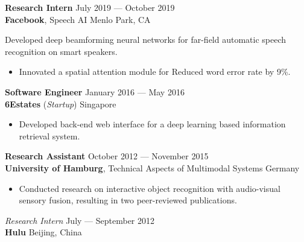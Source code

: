 \documentclass[a4paper,9pt]{extarticle} %
\begin{document}

\textbf{Research Intern} \hfill July 2019 --- October 2019 \\
\textbf{Facebook}, Speech AI  \hfill Menlo Park, CA \\
\vspace{-1.5\parskip}

Developed deep beamforming neural networks for far-field automatic speech recognition on smart speakers.
\vspace{-1.8\parskip}
\begin{itemize}[nosep]
  \item Innovated a spatial attention module for Reduced word error rate by 9\%.
\end{itemize}


\textbf{Software Engineer} \hfill January 2016 --- May 2016 \\
\textbf{6Estates} (\textit{Startup})  \hfill Singapore \\
\vspace{-1.5\parskip}

\begin{itemize}[nosep]
  \item Developed back-end web interface for a deep learning based information retrieval system.
\end{itemize}


\textbf{Research Assistant} \hfill October 2012 --- November 2015 \\
\textbf{University of Hamburg}, Technical Aspects of Multimodal Systems \hfill Germany \\
\vspace{-1.5\parskip}

\begin{itemize}[nosep]
  \item Conducted research on interactive object recognition with audio-visual sensory fusion, resulting in two peer-reviewed publications.
\end{itemize}


\textit{Research Intern} \hfill July --- September 2012 \\
\textbf{Hulu} \hfill Beijing, China \\
\vspace{-1.5\parskip}
\end{document}
